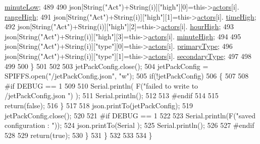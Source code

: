\begin{DoxyCode}
      \hyperlink{struct_jetpack_1_1state_aa699e25d802a00e86d3a8032ec48b88b}{minuteLow};
489 
490                 json[String(\textcolor{stringliteral}{"Act"})+String(i)][\textcolor{stringliteral}{"high"}][0]=this->\hyperlink{class_jetpack_a7e16d2f97837f9712a2e6de1c50d99db}{actors}[i].
      \hyperlink{struct_jetpack_1_1state_ae330612c3da637654ecfa89d36620b93}{rangeHigh};
491                 json[String(\textcolor{stringliteral}{"Act"})+String(i)][\textcolor{stringliteral}{"high"}][1]=this->\hyperlink{class_jetpack_a7e16d2f97837f9712a2e6de1c50d99db}{actors}[i].
      \hyperlink{struct_jetpack_1_1state_a97c594b20b03b46ae0a6ac544f5d6c8d}{timeHigh};
492                 json[String(\textcolor{stringliteral}{"Act"})+String(i)][\textcolor{stringliteral}{"high"}][2]=this->\hyperlink{class_jetpack_a7e16d2f97837f9712a2e6de1c50d99db}{actors}[i].
      \hyperlink{struct_jetpack_1_1state_ace824f4ae57fa1a4a27b2c6477b350e3}{hourHigh};
493                 json[String(\textcolor{stringliteral}{"Act"})+String(i)][\textcolor{stringliteral}{"high"}][3]=this->\hyperlink{class_jetpack_a7e16d2f97837f9712a2e6de1c50d99db}{actors}[i].
      \hyperlink{struct_jetpack_1_1state_a8c26c18b0ec449b7545934cb01cca028}{minuteHigh};
494 
495                 json[String(\textcolor{stringliteral}{"Act"})+String(i)][\textcolor{stringliteral}{"type"}][0]=this->\hyperlink{class_jetpack_a7e16d2f97837f9712a2e6de1c50d99db}{actors}[i].
      \hyperlink{struct_jetpack_1_1state_aa6242c32eb0ab42aaea170636ab949e1}{primaryType};
496                 json[String(\textcolor{stringliteral}{"Act"})+String(i)][\textcolor{stringliteral}{"type"}][1]=this->\hyperlink{class_jetpack_a7e16d2f97837f9712a2e6de1c50d99db}{actors}[i].
      \hyperlink{struct_jetpack_1_1state_a81cf9af139da095b7d91e2a87e50135b}{secondaryType};
497 
498 
499 
500             \}
501             
502 
503             jetPackConfig.close();          
504             jetPackConfig = SPIFFS.open(\textcolor{stringliteral}{"/jetPackConfig.json"}, \textcolor{stringliteral}{"w"});            
505             \textcolor{keywordflow}{if}(!jetPackConfig)
506             \{
507             
508 \textcolor{preprocessor}{            #if DEBUG == 1 }
509 
510                 Serial.println( F(\textcolor{stringliteral}{"failed to write to /jetPackConfig.json "}) );
511                 Serial.println();
512             
513 \textcolor{preprocessor}{            #endif}
514                 
515                 \textcolor{keywordflow}{return}(\textcolor{keyword}{false});          
516             \}  
517 
518             json.printTo(jetPackConfig);
519             jetPackConfig.close();
520 
521 \textcolor{preprocessor}{        #if DEBUG == 1 }
522             
523             Serial.println(F(\textcolor{stringliteral}{"saved configuration : "}));
524             json.printTo(Serial );
525             Serial.println();       
526         
527 \textcolor{preprocessor}{        #endif}
528 
529             \textcolor{keywordflow}{return}(\textcolor{keyword}{true}); 
530         \}
531     \}   
532     
533 
534 \}
\end{DoxyCode}
